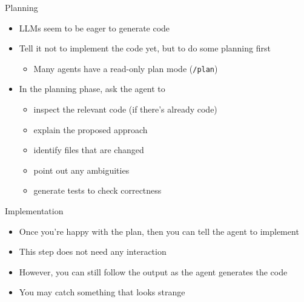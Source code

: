 \documentclass[
ps,
]{prosper}
\begin{document}
\begin{slide}{Planning}

\begin{itemize}

\item LLMs seem to be eager to generate code

\item Tell it not to implement the code yet, but to do some planning first

  \begin{itemize}
    
  \item Many agents have a read-only plan mode (\texttt{/plan})
    
  \end{itemize}

\item In the planning phase, ask the agent to

  \begin{itemize}
    
  \item inspect the relevant code (if there's already code)

  \item explain the proposed approach

  \item identify files that are changed

  \item point out any ambiguities

  \item generate tests to check correctness
    
  \end{itemize}
  
\end{itemize}
  
\end{slide}



\begin{slide}{Implementation}

\begin{itemize}

\item Once you're happy with the plan, then you can tell the agent to implement

\item This step does not need any interaction

\item However, you can still follow the output as the agent generates the code

\item You may catch something that looks strange %

\end{itemize}
  
\end{slide}
\end{document}
